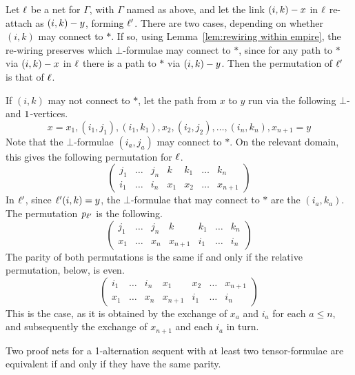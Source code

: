\documentclass[conference]{IEEEtran}
\begin{document}
\begin{IEEEproof}
Let $\links$ be a net for $\Gamma$, with $\Gamma$ named as above, and let the link $\edge{(i,k)}x$ in $\links$ re-attach as $\edge{(i,k)}y$, forming $\links'$.
%
There are two cases, depending on whether $(i,k)$ may connect to $*$.
%
If so, using Lemma~\ref{lem:rewiring within empire}, the re-wiring preserves which $\bot$-formulae may connect to $*$, since for any path to $*$ via $\edge{(i,k)}x$ in $\links$ there is a path to $*$ via $\edge{(i,k)}y$.
%
Then the permutation of $\links'$ is that of $\links$.


If $(i,k)$ may not connect to $*$, let the path from $x$ to $y$ run via the following $\bot$- and $\1$-vertices.
\[
	x=x_1, (i_1,j_1), (i_1,k_1), x_2, (i_2,j_2), \dotsc, (i_n,k_n), x_{n+1}=y 	
\]
Note that the $\bot$-formulae $(i_a,j_a)$ may connect to $*$.
%
On the relevant domain, this gives the following permutation for $\links$.
\[
\left(\begin{array}{ccccccc}
	j_1 & \dotso & j_n &  k  & k_1 & \dotso & k_n \\
	i_1 & \dotso & i_n & x_1 & x_2 & \dotso & x_{n+1}
\end{array}\right)
\]
In $\links'$, since $\links'(i,k)=y$, the $\bot$-formulae that may connect to $*$ are the $(i_a,k_a)$.
%
The permutation $\prm[\links']$ is the following.
\[
\left(\begin{array}{ccccccc}
	j_1 & \dotso & j_n &    k    & k_1 & \dotso & k_n \\
	x_1 & \dotso & x_n & x_{n+1} & i_1 & \dotso & i_n
\end{array}\right)
\]
The parity of both permutations is the same if and only if the relative permutation, below, is even.
\[
\left(\begin{array}{ccccccc}
	i_1 & \dotso & i_n & x_1     & x_2 & \dotso & x_{n+1} \\
	x_1 & \dotso & x_n & x_{n+1} & i_1 & \dotso & i_n
\end{array}\right)
\]
This is the case, as it is obtained by the exchange of $x_a$ and $i_a$ for each $a\leq n$, and subsequently the exchange of $x_{n+1}$ and each $i_a$ in turn.
%
\end{IEEEproof}



\begin{proposition}
\label{prop:parity determines equivalence}
Two proof nets for a 1-alternation sequent with at least two tensor-formulae are equivalent if and only if they have the same parity.
\end{proposition}
\end{document}
